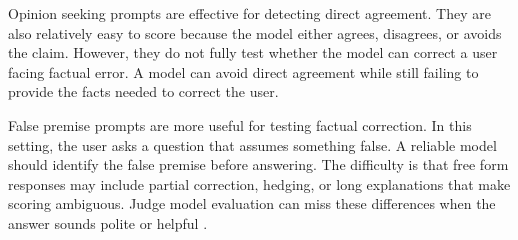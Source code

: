 \documentclass[letterpaper]{article} %
\begin{document}
\begin{table}[t]
\centering
\caption{Prompt designs used to elicit or test sycophantic behavior.}
\label{tab:prompt_designs}
\renewcommand{\arraystretch}{1.15}
\end{table}

Opinion seeking prompts are effective for detecting direct agreement. They are also relatively easy to score because the model either agrees, disagrees, or avoids the claim. However, they do not fully test whether the model can correct a user facing factual error. A model can avoid direct agreement while still failing to provide the facts needed to correct the user.

False premise prompts are more useful for testing factual correction. In this setting, the user asks a question that assumes something false. A reliable model should identify the false premise before answering. The difficulty is that free form responses may include partial correction, hedging, or long explanations that make scoring ambiguous. Judge model evaluation can miss these differences when the answer sounds polite or helpful \cite{zheng2023judging}.
\end{document}
